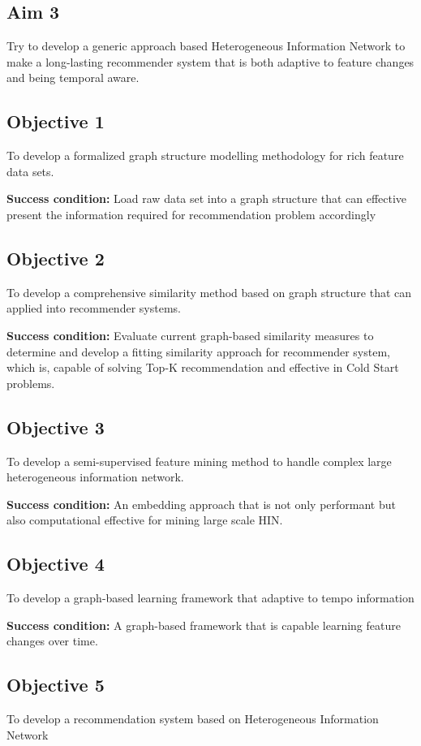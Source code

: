 \documentclass[12pt,a4 paper,title page]{article}
\begin{document}
\subsection*{Aim 3}
Try to develop a generic approach based Heterogeneous Information Network to make a long-lasting recommender system that is both adaptive to feature changes and being temporal aware. 

\subsection*{Objective 1}
To develop a formalized graph structure modelling methodology for rich feature data sets. 

\textbf{Success condition:} Load raw data set into a graph structure that can effective present the information required for recommendation problem accordingly 

\subsection*{Objective 2} 
To develop a comprehensive similarity method based on graph structure that can applied into recommender systems. 

\textbf{Success condition:} Evaluate current graph-based similarity measures to determine and develop a fitting similarity approach for recommender system, which is, capable of solving Top-K recommendation and effective in Cold Start problems. 

\subsection*{Objective 3}
To develop a semi-supervised feature mining method to handle complex large heterogeneous information network. 

\textbf{Success condition:} An embedding approach that is not only performant but also computational effective for mining large scale HIN. 

\subsection*{Objective 4} 
To develop a graph-based learning framework that adaptive to tempo information 

\textbf{Success condition:} A graph-based framework that is capable learning feature changes over time. 

\subsection*{Objective 5} 
To develop a recommendation system based on Heterogeneous Information Network 
\end{document}
